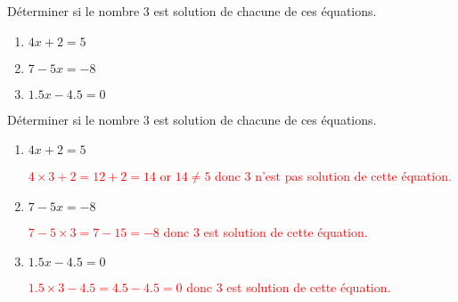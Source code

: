 \begin{exercice*}
    Déterminer si le nombre 3 est solution de chacune de ces équations.
    \begin{enumerate}
        \item $4x+2=5$
        \item $7-5x=-8$
        \item $\num{1.5}x-\num{4.5}=0$
    \end{enumerate}
\end{exercice*}
\begin{corrige}
    Déterminer si le nombre 3 est solution de chacune de ces équations.
    \begin{enumerate}
        \item $4x+2=5$
        
        \textcolor{red}{$4\times 3 + 2 = 12 + 2 = 14$ or $14 \neq 5$ donc $3$ n'est pas solution de cette équation.}
        \item $7-5x=-8$
        
        \textcolor{red}{$7-5\times 3 = 7-15 = -8$ donc $3$ est solution de cette équation.}
        \item $\num{1.5}x-\num{4.5}=0$
        
        \textcolor{red}{$\num{1.5}\times 3 - \num{4.5} = \num{4.5} - \num{4.5} = 0$ donc $3$ est solution de cette équation.}
    \end{enumerate}
\end{corrige}


